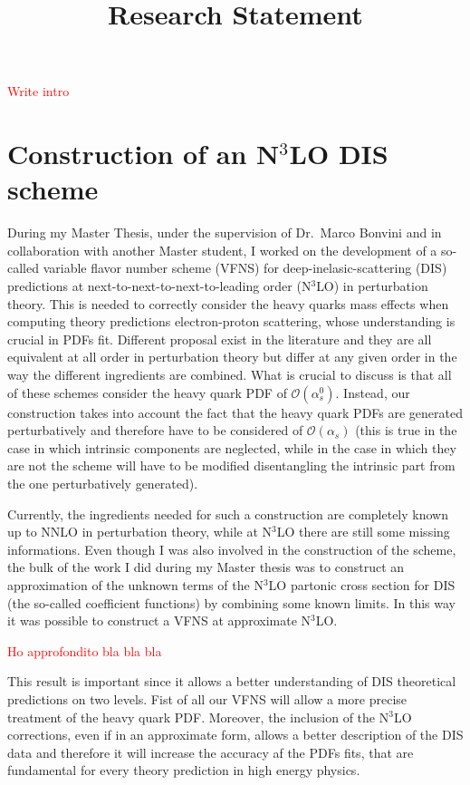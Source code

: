 \documentclass[11pt,a4paper]{moderncv}        %
\title{Research Statement}
\begin{document}
\makecvtitle

\textcolor{red}{Write intro}

\section{Construction of an N$^3$LO DIS scheme}

During my Master Thesis, under the supervision of Dr.\ Marco Bonvini and in collaboration with another Master student,
I worked on the development of a so-called variable flavor number scheme (VFNS) for deep-inelasic-scattering (DIS) predictions at
next-to-next-to-next-to-leading order (N$^3$LO) in perturbation theory.
This is needed to correctly consider the heavy quarks mass effects when computing theory predictions electron-proton scattering,
whose understanding is crucial in PDFs fit.
Different proposal exist in the literature and they are all equivalent at all order in perturbation theory but differ at any given
order in the way the different ingredients are combined.
What is crucial to discuss is that all of these schemes consider the heavy quark PDF of $\mathcal{O}(\alpha_s^0)$.
Instead, our construction takes into account the fact that the heavy quark PDFs are generated
perturbatively and therefore have to be considered of $\mathcal{O}(\alpha_s)$ (this is true in the case in which intrinsic components are neglected, while in the case in which they are not the scheme will
have to be modified disentangling the intrinsic part from the one perturbatively generated).

Currently, the ingredients needed for such a construction are completely known up to NNLO in perturbation theory, while at N$^3$LO
there are still some missing informations.
Even though I was also involved in the construction of the scheme, the bulk of the work I did during my Master thesis was to
construct an approximation of the unknown terms of the N$^3$LO partonic cross section for DIS (the so-called coefficient functions) by
combining some known limits.
In this way it was possible to construct a VFNS at approximate N$^3$LO.

\textcolor{red}{Ho approfondito bla bla bla}

This result is important since it allows a better understanding of DIS theoretical predictions on two levels.
Fist of all our VFNS will allow a more precise treatment of the heavy quark PDF.
Moreover, the inclusion of the N$^3$LO corrections, even if in an approximate form, allows a better description of the DIS data
and therefore it will increase the accuracy af the PDFs fits, that are fundamental for every theory prediction in high energy physics.
\end{document}
